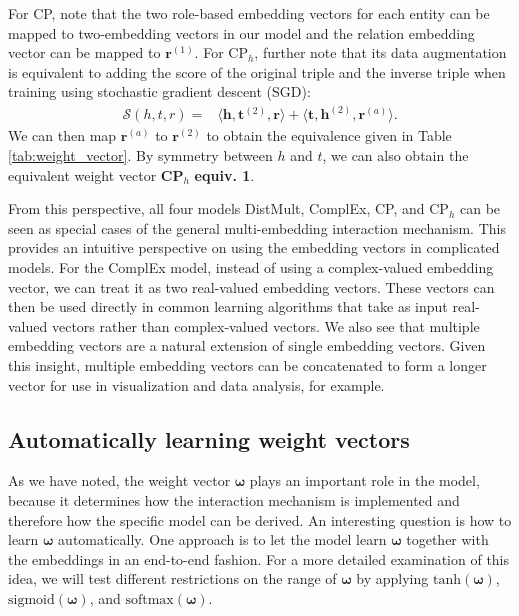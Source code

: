 \documentclass[sigconf,edbt]{acmart-edbt2019}
\def\vh{{\bm{h}}}
\def\vr{{\bm{r}}}
\def\vt{{\bm{t}}}
\def\gS{{\mathcal{S}}}
\begin{document}
For CP, note that the two role-based embedding vectors for each entity can be mapped to two-embedding vectors in our model and the relation embedding vector can be mapped to $ \vr^{(1)} $. For CP$ _h $, further note that its data augmentation is equivalent to adding the score of the original triple and the inverse triple when training using stochastic gradient descent (SGD):
\begin{equation} \label{eq:cph_add}
\begin{split}
\gS(h,t,r) = &\langle \vh, \vt^{(2)}, \vr \rangle + \langle \vt, \vh^{(2)}, \vr^{(a)} \rangle.
\end{split}
\end{equation}
We can then map $ \vr^{(a)} $ to $ \vr^{(2)} $ to obtain the equivalence given in Table \ref{tab:weight_vector}. By symmetry between $ h $ and $ t $, we can also obtain the equivalent weight vector \textbf{CP$ _h $} \textbf{equiv. 1}.

From this perspective, all four models DistMult, ComplEx, CP, and CP$ _h $ can be seen as special cases of the general multi-embedding interaction mechanism. This provides an intuitive perspective on using the embedding vectors in complicated models. For the ComplEx model, instead of using a complex-valued embedding vector, we can treat it as two real-valued embedding vectors. These vectors can then be used directly in common learning algorithms that take as input real-valued vectors rather than complex-valued vectors. We also see that multiple embedding vectors are a natural extension of single embedding vectors. Given this insight, multiple embedding vectors can be concatenated to form a longer vector for use in visualization and data analysis, for example.


\subsection{Automatically learning weight vectors}
As we have noted, the weight vector $ \bm{\omega} $ plays an important role in the model, because it determines how the interaction mechanism is implemented and therefore how the specific model can be derived. An interesting question is how to learn $ \bm{\omega} $ automatically. One approach is to let the model learn $ \bm{\omega} $ together with the embeddings in an end-to-end fashion. For a more detailed examination of this idea, we will test different restrictions on the range of $ \bm{\omega} $ by applying $ \text{tanh}(\bm{\omega}) $, $ \text{sigmoid}(\bm{\omega}) $, and $ \text{softmax}(\bm{\omega}) $.
\end{document}
